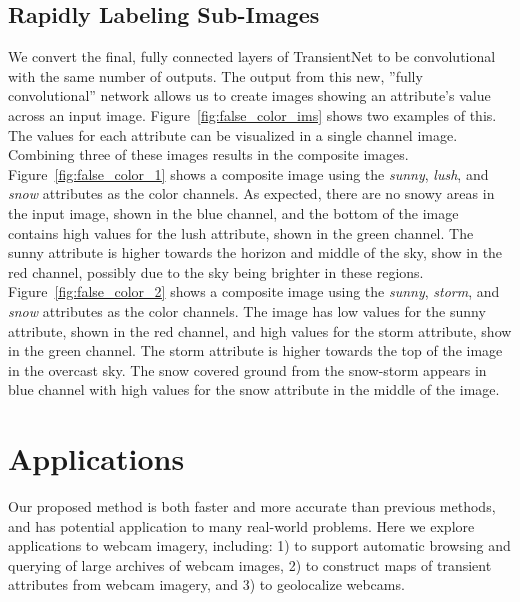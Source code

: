 \documentclass[10pt,twocolumn,letterpaper]{article}
\newcommand{\figref}[1]{Figure~\ref{fig:#1}}
\begin{document}


\subsection{Rapidly Labeling Sub-Images}

We convert the final, fully connected layers of TransientNet to be
convolutional with the same number of outputs.  The output from this new,
''fully convolutional'' network allows us to create images showing an
attribute's value across an input image.  \figref{false_color_ims} shows two
examples of this.  The values for each attribute can be visualized in a single
channel image.  Combining three of these images results in the composite
images.  \figref{false_color_1} shows a composite image using the
\textit{sunny}, \textit{lush}, and \textit{snow} attributes as the color
channels.  As expected, there are no snowy areas in the input image, shown in
the blue channel, and the bottom of the image contains high values for the lush
attribute, shown in the green channel.  The sunny attribute is higher towards
the horizon and middle of the sky, show in the red channel, possibly due to the
sky being brighter in these regions.  \figref{false_color_2} shows a composite
image using the \textit{sunny}, \textit{storm}, and \textit{snow} attributes as
the color channels.  The image has low values for the sunny attribute, shown in
the red channel, and high values for the storm attribute, show in the green
channel.  The storm attribute is higher towards the top of the image in the
overcast sky.  The snow covered ground from the snow-storm appears in blue
channel with high values for the snow attribute in the middle of the image.


\section{Applications}

Our proposed method is both faster and more accurate than previous
methods, and has potential application to many real-world problems.
Here we explore applications to webcam imagery,
including: 1) to support automatic browsing and querying of large
archives of webcam images, 2) to construct maps of transient
attributes from webcam imagery, and 3) to geolocalize webcams.
\end{document}
